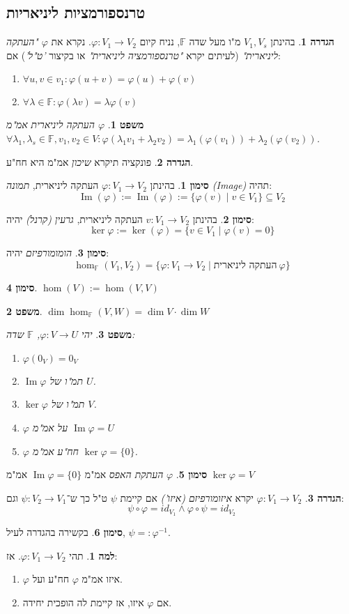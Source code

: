 \documentclass[]{article}
\DeclareMathOperator\Img   {Im}
\newcommand\F         {\mathbb{F}}
\newcommand\co        {\colon}
\renewcommand\lg      {\lambda}
\newcommand\op    {^{-1}}
\renewcommand\phi     {\varphi}
\newtheorem{Theorem}{משפט}
\theoremstyle{definition}
\newtheorem{definition}{הגדרה}
\newtheorem{Lemma}{למה}
\newtheorem{Notion}{סימון}
\newcommand\theo  [1] {\begin{Theorem}#1\end{Theorem}}
\newcommand\defi  [1] {\begin{definition}#1\end{definition}}
\newcommand\lem   [1] {\begin{Lemma}#1\end{Lemma}}
\newcommand\noti  [1] {\begin{Notion}#1\end{Notion}}
\begin{document}
\begin{multicols}{2}
		\section{טרנספורמציות ליניאריות}
		\defi{בהינתן $V_1, V_s$ מ"ו מעל שדה $\F$, נניח קיום $\phi \co V_1 \to V_2$. נקרא את $\phi$ \textit{"העתקה ליניארית"} (לעיתים יקרא \textit{"טרנספורמציה ליניארית"} או בקיצור \textit{'ט"ל'}) אם: 
		\begin{enumerate}
			\item \hfil $\forall u, v \in v_1 \co \phi(u + v) = \phi(u) + \phi(v)$
			\item \hfil $\forall \lg \in \F \co \phi(\lg v) = \lg\phi(v)$
		\end{enumerate}}
		\theo{$\phi$ העתקה ליניארית אמ"מ $\forall \lg_1, \lg_s \in \F, v_1, v_2 \in V \co \phi(\lg_1v_1 + \lg_2v_2) = \lg_1(\phi (v_1)) + \lg_2(\phi(v_2))$. }
		\defi{פונקציה תיקרא \textit{שיכון} אמ"מ היא חח"ע. }
		\noti{בהינתן $\phi \co V_1 \to V_2$ העתקה ליניארית, \textit{תמונה (Image)} תהיה: 
			\[\Img(\phi) := \Img(\phi) := \{\phi(v) \mid v \in V_1\} \subseteq V_2\]}
		\noti{בהינתן $v \co V_1 \to V_2$ העתקה ליניארית, \textit{גרעין (קרנל)} יהיה: 
		\[ \ker\phi := \ker(\phi) = \{v \in V_1 \mid \phi(v) = 0\} \]}
		\noti{\textit{הומומורפיזם} יהיה: 
		\[ \hom_\F(V_1, V_2) = \{\phi \co V_1 \to V_2 \mid \text{העתקה ליניארית}\ \phi \} \]}
		\noti{\hfil $\hom(V) := \hom(V, V)$}
		\theo{\hfil $\dim \hom_{\F}(V, W) = \dim V \cdot \dim W$}
		\theo{יהי $\phi \co V \to U$, $\F$ שדה: 
		\begin{enumerate}
			\item \hfil $\phi(0_V) = 0_V$
			\item $\Img\phi$ תמ"ו של $U$. 
			\item $\ker\phi$ תמ"ו של $V$. 
			\item $\phi$ על אמ"מ $\Img\phi = U$
			\item $\phi$ חח"ע אמ"מ $\ker\phi = \{0\}$. 
		\end{enumerate}}
		\noti{$\phi$ \textit{העתקת האפס} אמ"מ $\Img\phi = \{0\}$ אמ"מ $\ker\phi = V$}
		\defi{$\phi \co V_1 \to V_2$ יקרא \textit{איזומורפיזם (איזו')} אם קיימת $\psi$ ט"ל כך ש־$\psi \co V_2 \to V_1$ וגם: 
		\[ \psi \circ \phi  = id_{V_1} \land \phi \circ \psi = id_{V_2} \]}
		\noti{בקשירה בהגדרה לעיל, $\psi =: \phi\op$. }
		\lem{תהי $\phi \co V_1 \to V_2$. אז: 
		\begin{enumerate}
			\item $\phi$ איזו אמ"מ $\phi$ חח"ע ועל. 
			\item אם $\phi$ איזו, אז קיימת לה הופכית יחידה. 

\end{enumerate}}
\end{multicols}
\end{document}
